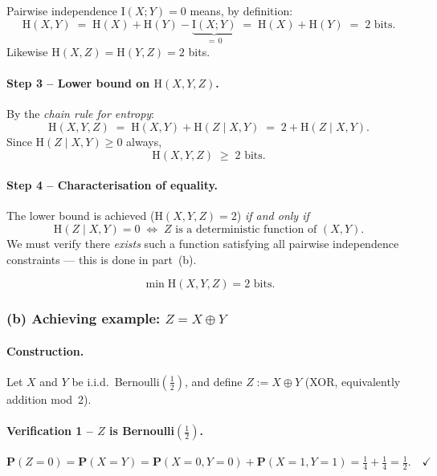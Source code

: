 \documentclass[12pt,a4paper]{article}
\theoremstyle{plain}
\theoremstyle{definition}
\theoremstyle{remark}
\newcommand{\HH}{\mathrm{H}}
\newcommand{\II}{\mathrm{I}}
\newcommand{\PP}{\mathbf{P}}
\begin{document}
Pairwise independence $\II(X;Y)=0$ means, by definition:
\[
  \HH(X,Y) \;=\; \HH(X) + \HH(Y) - \underbrace{\II(X;Y)}_{=\,0}
  \;=\; \HH(X) + \HH(Y) \;=\; 2\text{ bits.}
\]
Likewise $\HH(X,Z) = \HH(Y,Z) = 2$ bits.

\paragraph{Step 3 – Lower bound on $\HH(X,Y,Z)$.}

By the \emph{chain rule for entropy}:
\[
  \HH(X,Y,Z)
    \;=\; \HH(X,Y) + \HH(Z\mid X,Y)
    \;=\; 2 + \HH(Z\mid X,Y).
\]
Since $\HH(Z\mid X,Y) \ge 0$ always,
\[
  \HH(X,Y,Z) \;\ge\; 2\text{ bits.}
\]

\paragraph{Step 4 – Characterisation of equality.}

The lower bound is achieved ($\HH(X,Y,Z)=2$) \emph{if and only if}
\[
  \HH(Z\mid X,Y) = 0 \;\Longleftrightarrow\; Z \text{ is a deterministic function of } (X,Y).
\]
We must verify there \emph{exists} such a function satisfying all pairwise
independence constraints — this is done in part~(b).

\begin{resultbox}
\[
  \boxed{\min \HH(X,Y,Z) = 2\text{ bits.}}
\]
\end{resultbox}

\subsubsection*{(b) Achieving example: $Z = X \oplus Y$}

\paragraph{Construction.}

Let $X$ and $Y$ be i.i.d.\ Bernoulli$(\tfrac{1}{2})$, and define
$Z := X \oplus Y$ (XOR, equivalently addition mod~2).

\paragraph{Verification 1 – $Z$ is Bernoulli$(\tfrac{1}{2})$.}
\[
  \PP(Z=0) = \PP(X=Y) = \PP(X=0,Y=0)+\PP(X=1,Y=1) = \tfrac{1}{4}+\tfrac{1}{4} = \tfrac{1}{2}.\quad\checkmark
\]
\end{document}
